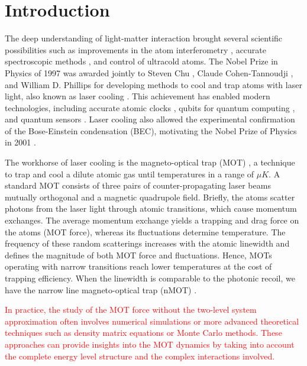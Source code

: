 %
%
\chapter{Introduction}
\label{ch:introduction}

The deep understanding of light-matter interaction brought several scientific possibilities such as improvements in the atom interferometry \cite{peters2001high}, accurate spectroscopic methods \cite{mukamel2020roadmap}, and control of ultracold atoms. 
The Nobel Prize in Physics of 1997 was awarded jointly to Steven Chu \cite{chu1998nobel}, Claude Cohen-Tannoudji \cite{cohen1998nobel}, and William D. Phillips \cite{phillips1998nobel} for developing methods to cool and trap atoms with laser light, also known as laser cooling \cite{metcalf2007laser}. This achievement has enabled modern technologies, including accurate atomic clocks \cite{ludlow2015optical}, qubits for quantum computing \cite{schneider2012quantum}, and quantum sensors \cite{zhang2016precision}. Laser cooling also allowed the experimental confirmation of the Bose-Einstein condensation (BEC), motivating the Nobel Prize of Physics in 2001 \cite{cornell2002nobel, ketterle2002nobel}.

The workhorse of laser cooling is the magneto-optical trap (MOT) \cite{krzysztof2010magneto}, a technique to trap and cool a dilute atomic gas until temperatures in a range of $\mu K$. A standard MOT consists of three pairs of counter-propagating laser beams mutually orthogonal and a magnetic quadrupole field. Briefly, the atoms scatter photons from the laser light through atomic transitions, which cause momentum exchanges. The average momentum exchange yields a trapping and drag force on the atoms (MOT force), whereas its fluctuations determine temperature. The frequency of these random scatterings increases with the atomic linewidth and defines the magnitude of both MOT force and fluctuations. Hence, MOTs operating with narrow transitions reach lower temperatures at the cost of trapping efficiency. When the linewidth is comparable to the photonic recoil, we have the narrow line magneto-optical trap (nMOT) \cite{frisch2012narrow, maier2014narrow, miyazawa2021narrow}.

\textcolor{red}{In practice, the study of the MOT force without the two-level system approximation often involves numerical simulations or more advanced theoretical techniques such as density matrix equations or Monte Carlo methods. These approaches can provide insights into the MOT dynamics by taking into account the complete energy level structure and the complex interactions involved.}

